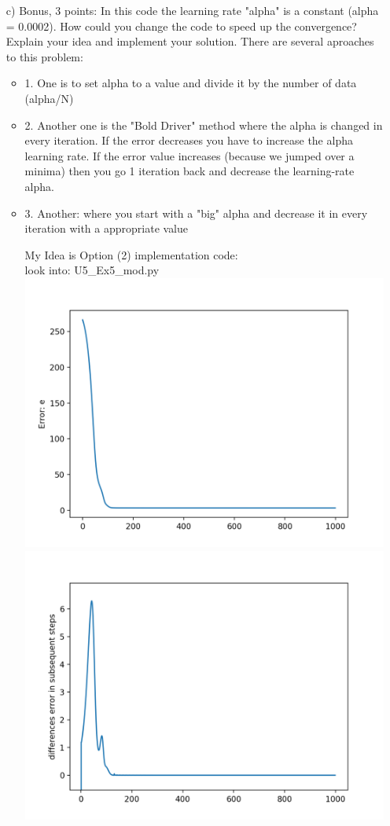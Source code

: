 \documentclass[11pt,a4paper]{scrartcl}
\begin{document}
\begin{itemize}
	\item [c)] Bonus, 3 points: In this code the learning rate "alpha" is a constant (alpha = 0.0002). How could you change the code to speed up the convergence? Explain your idea and implement your solution.
	There are several aproaches to this problem:
		\begin{itemize}
		\item 1. One is to set alpha to a value and divide it by the number of data (alpha/N)
		\item 2. Another one is the "Bold Driver" method where the alpha is changed in every iteration. If the error decreases you have to increase the alpha learning rate. If the error value increases (because we jumped over a minima) then you go 1 iteration back and decrease the learning-rate alpha.
		\item 3. Another: where you start with a "big" alpha and decrease it in every iteration with a appropriate value
		
		My Idea is Option (2) implementation code:\\
		 look into: U5\_Ex5\_mod.py\\
		 \includegraphics[scale=0.5]{Plot_Error_modAlpha}
		\includegraphics[scale=0.5]{DEISS_Zoomed_modAlpha}
		
		
		
	\end{itemize}
\end{itemize}
	
\end{document}
